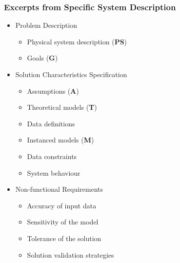 \documentclass[t,12pt,numbers,fleqn]{beamer}
\begin{document}
\begin{frame}
\frametitle{Excerpts from Specific System Description}

\begin{itemize}

\item Problem Description
\begin{itemize}
\item Physical system description (\textbf{PS}) 
\item Goals (\textbf{G})
\end{itemize}
 
\item Solution Characteristics Specification
\begin{itemize}
\item Assumptions (\textbf{A})
\item Theoretical models (\textbf{T})
\item Data definitions
\item Instanced models (\textbf{M})
\item Data constraints
\item System behaviour
\end{itemize}

\item Non-functional Requirements
\begin{itemize}
\item Accuracy of input data
\item Sensitivity of the model
\item Tolerance of the solution
\item Solution validation strategies
\end{itemize}

\end{itemize}

\end{frame}

\end{document}
